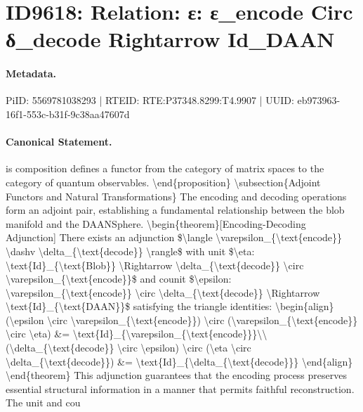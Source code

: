 \section*{ID9618: Relation: ε: ε\_encode Circ δ\_decode Rightarrow Id\_DAAN}
\paragraph{Metadata.}
PiID: 5569781038293 | RTEID: RTE:P37348.8299:T4.9907 | UUID: eb973963-16f1-553c-b31f-9c38aa47607d

\paragraph{Canonical Statement.}
is composition defines a functor from the category of matrix spaces to the category of quantum observables. \textbackslash{}end\{proposition\} \textbackslash{}subsection\{Adjoint Functors and Natural Transformations\} The encoding and decoding operations form an adjoint pair, establishing a fundamental relationship between the blob manifold and the DAANSphere. \textbackslash{}begin\{theorem\}[Encoding-Decoding Adjunction] There exists an adjunction \$\textbackslash{}langle \textbackslash{}varepsilon\_\{\textbackslash{}text\{encode\}\} \textbackslash{}dashv \textbackslash{}delta\_\{\textbackslash{}text\{decode\}\} \textbackslash{}rangle\$ with unit \$\textbackslash{}eta: \textbackslash{}text\{Id\}\_\{\textbackslash{}text\{Blob\}\} \textbackslash{}Rightarrow \textbackslash{}delta\_\{\textbackslash{}text\{decode\}\} \textbackslash{}circ \textbackslash{}varepsilon\_\{\textbackslash{}text\{encode\}\}\$ and counit \$\textbackslash{}epsilon: \textbackslash{}varepsilon\_\{\textbackslash{}text\{encode\}\} \textbackslash{}circ \textbackslash{}delta\_\{\textbackslash{}text\{decode\}\} \textbackslash{}Rightarrow \textbackslash{}text\{Id\}\_\{\textbackslash{}text\{DAAN\}\}\$ satisfying the triangle identities: \textbackslash{}begin\{align\} (\textbackslash{}epsilon \textbackslash{}circ \textbackslash{}varepsilon\_\{\textbackslash{}text\{encode\}\}) \textbackslash{}circ (\textbackslash{}varepsilon\_\{\textbackslash{}text\{encode\}\} \textbackslash{}circ \textbackslash{}eta) \&= \textbackslash{}text\{Id\}\_\{\textbackslash{}varepsilon\_\{\textbackslash{}text\{encode\}\}\}\textbackslash{}\textbackslash{} (\textbackslash{}delta\_\{\textbackslash{}text\{decode\}\} \textbackslash{}circ \textbackslash{}epsilon) \textbackslash{}circ (\textbackslash{}eta \textbackslash{}circ \textbackslash{}delta\_\{\textbackslash{}text\{decode\}\}) \&= \textbackslash{}text\{Id\}\_\{\textbackslash{}delta\_\{\textbackslash{}text\{decode\}\}\} \textbackslash{}end\{align\} \textbackslash{}end\{theorem\} This adjunction guarantees that the encoding process preserves essential structural information in a manner that permits faithful reconstruction. The unit and cou

